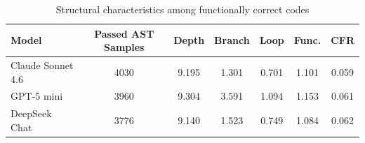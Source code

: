 \begin{table}[t]
\centering
\caption{Structural characteristics among functionally correct codes}
\label{tab:passed_only_structural_characteristics}
\begin{tabular}{lcccccc}
\toprule
Model & Passed AST Samples & Depth & Branch & Loop & Func. & CFR \\
\midrule
Claude Sonnet 4.6 & 4030 & 9.195 & 1.301 & 0.701 & 1.101 & 0.059 \\
GPT-5 mini & 3960 & 9.304 & 3.591 & 1.094 & 1.153 & 0.061 \\
DeepSeek Chat & 3776 & 9.140 & 1.523 & 0.749 & 1.084 & 0.062 \\
\bottomrule
\end{tabular}
\end{table}
